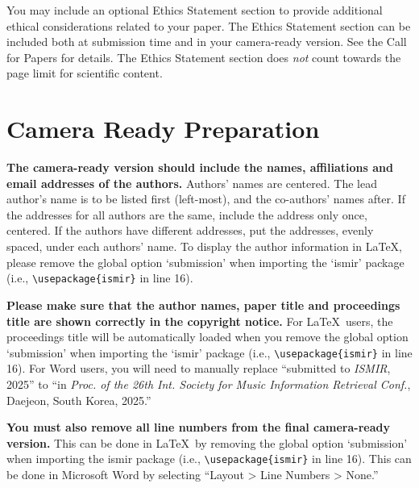 \documentclass{article}
\begin{document}
You may include an optional Ethics Statement section to provide additional ethical considerations related to your paper. The Ethics Statement section can be included both at submission time and in your camera-ready version. See the Call for Papers for details. The Ethics Statement section does \textit{not} count towards the page limit for scientific content.

\section{Camera Ready Preparation}\label{sec:cameraready}

\textbf{The camera-ready version should include the names, affiliations and email addresses of the authors.} Authors' names are centered. The lead author's name is to be listed first (left-most), and the co-authors' names after. If the addresses for all authors are the same, include the address only once, centered. If the authors have different addresses, put the addresses, evenly spaced, under each authors' name. To display the author information in \LaTeX, please remove the global option `submission' when importing the `ismir' package (i.e., \texttt{\textbackslash usepackage\{ismir\}} in line 16).

\textbf{Please make sure that the author names, paper title and proceedings title are shown correctly in the copyright notice.} For \LaTeX\ users, the proceedings title will be automatically loaded when you remove the global option `submission' when importing the `ismir' package (i.e., \texttt{\textbackslash usepackage\{ismir\}} in line 16). For Word users, you will need to manually replace ``submitted to \textit{ISMIR}, 2025'' to ``in \textit{Proc. of the 26th Int. Society for Music Information Retrieval Conf.}, Daejeon, South Korea, 2025.''

\textbf{You must also remove all line numbers from the final camera-ready version.} This can be done in \LaTeX\ by removing the global option `submission' when importing the ismir package (i.e., \texttt{\textbackslash usepackage\{ismir\}} in line 16). This can be done in Microsoft Word by selecting ``Layout > Line Numbers > None.''



%
%
%
%
\end{document}

